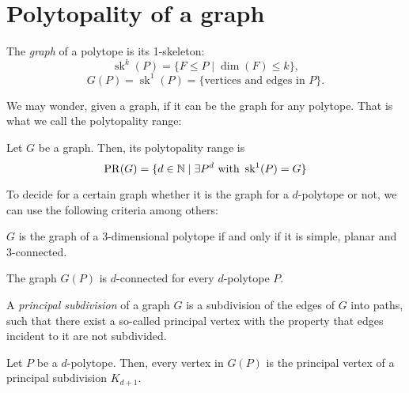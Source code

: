 \chapter*{Polytopality of a graph}

The \emph{graph} of a polytope is its 1-skeleton:
$$\operatorname{sk}^k(P) = \{F \leq P \mid \dim(F) \leq k\},$$
$$G(P) = \operatorname{sk}^1(P) = \{\text{vertices and edges in } P\}.$$

We may wonder, given a graph, if it can be the graph for any polytope. That is what we call the polytopality range:

\begin{definition}
Let $G$ be a graph. Then, its polytopality range is
$$\operatorname{PR}(G) = \{ d\in \mathbb{N} \mid \exists P^d \text{ with } \operatorname{sk}^1(P) = G\}$$
\end{definition}

To decide for a certain graph whether it is the graph for a $d$-polytope or not, we can use the following criteria among others:

\begin{theorem}[Steinitz]
$G$ is the graph of a 3-dimensional polytope if and only if it is simple, planar and 3-connected.
\end{theorem}

\begin{theorem}[Balinski]
The graph $G(P)$ is $d$-connected for every $d$-polytope $P$.
\end{theorem}

\begin{definition}
A \emph{principal subdivision} of a graph $G$ is a subdivision of the edges of $G$ into paths, such that there exist a so-called principal vertex with the property that edges incident to it are not subdivided.
\end{definition}

\begin{proposition}
Let $P$ be a $d$-polytope. Then, every vertex in $G(P)$ is the principal vertex of a principal subdivision $K_{d+1}$.
\end{proposition}

